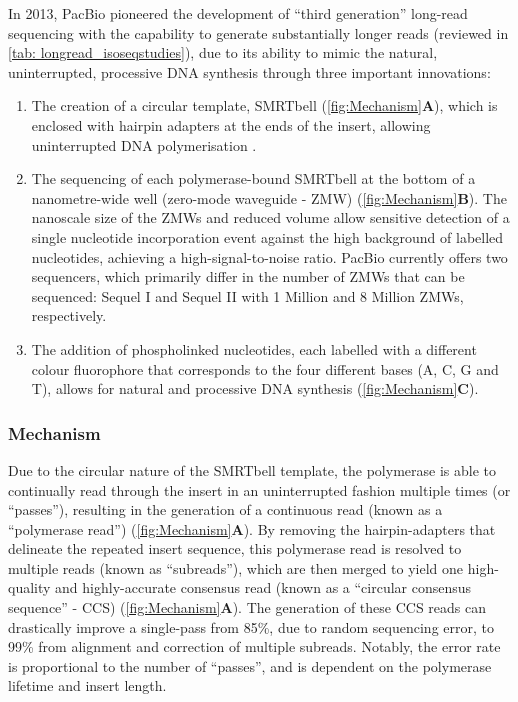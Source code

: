 In 2013, PacBio pioneered the development of “third generation” long-read sequencing with the capability to generate substantially longer reads (reviewed in \cref{tab: longread_isoseqstudies}), due to its ability to mimic the natural, uninterrupted, processive DNA synthesis through three important innovations\cite{Eid2009}: 
\begin{enumerate}
	\item The creation of a circular template, SMRTbell (\cref{fig:Mechanism}\textbf{A}), which is enclosed with hairpin adapters at the ends of the insert, allowing uninterrupted DNA polymerisation \cite{Travers2010}.
	\item The sequencing of each polymerase-bound SMRTbell at the bottom of a nanometre-wide well (zero-mode waveguide - ZMW)\cite{Levene2003} (\cref{fig:Mechanism}\textbf{B}). The nanoscale size of the ZMWs and reduced volume allow sensitive detection of a single nucleotide incorporation event against the high background of labelled nucleotides, achieving a high-signal-to-noise ratio. PacBio currently offers two sequencers, which primarily differ in the number of ZMWs that can be sequenced: Sequel I and Sequel II with 1 Million and 8 Million ZMWs, respectively.   
	\item The addition of phospholinked nucleotides, each labelled with a different colour fluorophore that corresponds to the four different bases (A, C, G and T), allows for natural and processive DNA synthesis\cite{Mccarthy2010} (\cref{fig:Mechanism}\textbf{C}). 
\end{enumerate}

\subsubsection{Mechanism}
Due to the circular nature of the SMRTbell template, the polymerase is able to continually read through the insert in an uninterrupted fashion multiple times (or “passes”), resulting in the generation of a continuous read (known as a “polymerase read”) (\cref{fig:Mechanism}\textbf{A}). By removing the hairpin-adapters that delineate the repeated insert sequence, this polymerase read is resolved to multiple reads (known as “subreads”), which are then merged to yield one high-quality and highly-accurate consensus read (known as a “circular consensus sequence” - CCS) (\cref{fig:Mechanism}\textbf{A}). The generation of these CCS reads can drastically improve a single-pass from 85\%, due to random sequencing error, to 99\% from alignment and correction of multiple subreads. Notably, the error rate is proportional to the number of “passes”, and is dependent on the polymerase lifetime and insert length\cite{Travers2010}. 

